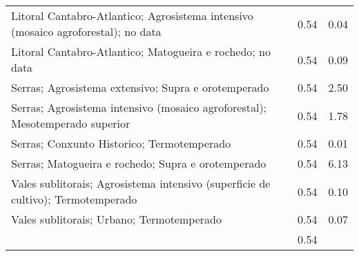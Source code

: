 \begin{table}[p]
\begin{tabular}{lrr}
  Litoral Cantabro-Atlantico; Agrosistema intensivo (mosaico agroforestal); no data & 0.54 & 0.04 \\ 
  Litoral Cantabro-Atlantico; Matogueira e rochedo; no data & 0.54 & 0.09 \\ 
  Serras; Agrosistema extensivo; Supra e orotemperado & 0.54 & 2.50 \\ 
  Serras; Agrosistema intensivo (mosaico agroforestal); Mesotemperado superior & 0.54 & 1.78 \\ 
  Serras; Conxunto Historico; Termotemperado & 0.54 & 0.01 \\ 
  Serras; Matogueira e rochedo; Supra e orotemperado & 0.54 & 6.13 \\ 
  Vales sublitorais; Agrosistema intensivo (superficie de cultivo); Termotemperado & 0.54 & 0.10 \\ 
  Vales sublitorais; Urbano; Termotemperado & 0.54 & 0.07 \\ 
   & 0.54 &  \\ 
   \hline
\end{tabular}
\end{table}
